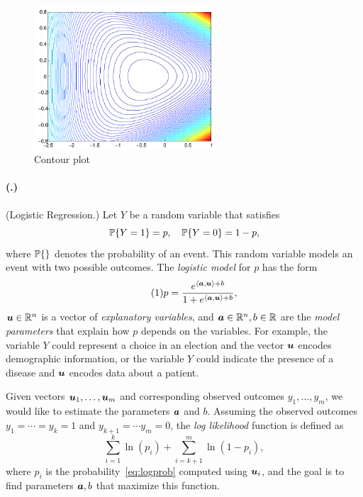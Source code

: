 \documentclass{article}
\newcounter{problemSheetNumber}
\newcounter{problems}
\renewcommand{\problem}{\paragraph{(\theproblemSheetNumber.\theproblems)}\addtocounter{problems}{1}}
\begin{document}
\begin{figure}[h!]
 \centering
 \includegraphics[width=0.6\textwidth]{images/contour_cropped.pdf}
 \caption{Contour plot}\label{fig:contour}
\end{figure}

\problem (Logistic Regression.) Let $Y$ be a random variable that satisfies
 \begin{equation*}
  \mathbb{P}\{Y=1\} = p, \quad \mathbb{P}\{Y=0\} = 1-p,
 \end{equation*}
 where $\mathbb{P}\{\}$ denotes the probability of an event.
This random variable models an event with two possible outcomes. The {\em logistic model} for $p$ has the form
\begin{equation}\label{eq:logprob}\tag{1}
 p = \frac{e^{\langle {\bm{a}}, {\bm{u}} \rangle+b}}{1+e^{\langle {\bm{a}}, {\bm{u}} \rangle+b}},
\end{equation}
$\bm{u}\in \mathbb{R}^n$ is a vector of {\em explanatory variables}, and $\bm{a}\in \mathbb{R}^n, b\in \mathbb{R}$ are the {\em model parameters} that explain how $p$ depends on the variables. For example, the variable $Y$ could represent a choice in an election and the vector $\bm{u}$ encodes demographic information, or the variable $Y$ could indicate the presence of a disease and $\bm{u}$ encodes data about a patient.

Given vectors $\bm{u}_1,\dots,\bm{u}_m$ and corresponding observed outcomes $y_1,\dots,y_m$, we would like to estimate the parameters $\bm{a}$ and $b$. Assuming the observed outcomes $y_1=\cdots =y_k=1$ and $y_{k+1}=\cdots y_m=0$, the {\em log likelihood} function is defined as
\begin{equation}\label{eq:mlprod}\tag{2}
 \sum_{i=1}^k \ln(p_i) +\sum_{i=k+1}^m \ln(1-p_i),
\end{equation}
where $p_i$ is the probability~\eqref{eq:logprob} computed using $\bm{u}_i$,
and the goal is to find parameters $\bm{a},b$ that maximize this function.
\end{document}
